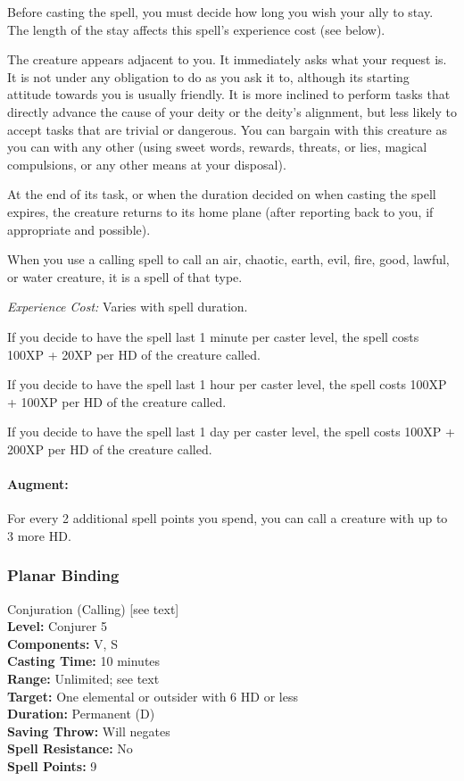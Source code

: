 Before casting the spell, you must decide how long you wish your ally to stay. 
The length of the stay affects this spell's experience cost (see below).

The creature appears adjacent to you. 
It immediately asks what your request is.
It is not under any obligation to do as you ask it to, although its starting attitude towards you is usually friendly.
It is more inclined to perform tasks that directly advance the cause of your deity or the deity's alignment, but less likely to accept tasks that are trivial or dangerous. You can bargain with this creature as you can with any other (using sweet words, rewards, threats, or lies, magical compulsions, or any other means at your disposal).

At the end of its task, or when the duration decided on when casting the spell expires, the creature returns to its home plane (after reporting back to you, if appropriate and possible).

When you use a calling spell to call an air, chaotic, earth, evil, fire, good, lawful, or water creature, it is a spell of that type.

\emph{Experience Cost:} Varies with spell duration.
\begin{list}{}{\leftmargin=1em}
 \item If you decide to have the spell last 1 minute per caster level, the spell costs 100XP + 20XP per HD of the creature called.
 \item If you decide to have the spell last 1 hour per caster level, the spell costs 100XP + 100XP per HD of the creature called. 
 \item If you decide to have the spell last 1 day per caster level, the spell costs 100XP + 200XP per HD of the creature called. 
\end{list} 

\paragraph{Augment:} For every 2 additional spell points you spend, you can call a creature with up to 3 more HD.
\subsubsection{Planar Binding}
\label{Spell:PlanarBinding}
Conjuration (Calling) [see text]
\\ \textbf{Level:} Conjurer 5
\\ \textbf{Components:} V, S
\\ \textbf{Casting Time:} 10 minutes
\\ \textbf{Range:} Unlimited; see text
\\ \textbf{Target:} One elemental or outsider with 6 HD or less
\\ \textbf{Duration:} Permanent (D)
\\ \textbf{Saving Throw:} Will negates
\\ \textbf{Spell Resistance:} No
\\ \textbf{Spell Points:} 9

